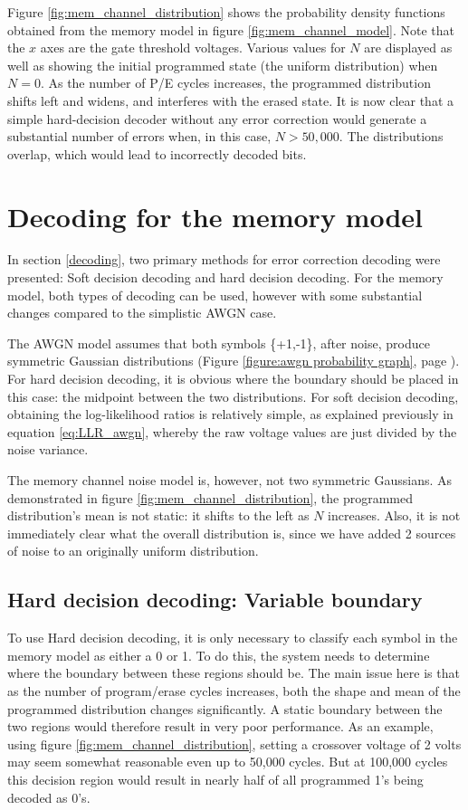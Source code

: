 \documentclass[11pt]{article}
\numberwithin{equation}{subsection}
\begin{document}
Figure \ref{fig:mem_channel_distribution} shows the probability density functions obtained from the memory model in figure \ref{fig:mem_channel_model}. Note that the $x$ axes are the gate threshold voltages. Various values for $N$ are displayed as well as showing the initial programmed state (the uniform distribution) when $N=0$. As the number of P/E cycles increases, the programmed distribution shifts left and widens, and interferes with the erased state. It is now clear that a simple hard-decision decoder without any error correction would generate a substantial number of errors when, in this case, $N > 50,000$. The distributions overlap, which would lead to incorrectly decoded bits.

\section{Decoding for the memory model} \label{section:memoryDecoding}

In section \ref{decoding}, two primary methods for error correction decoding were presented: Soft decision decoding and hard decision decoding. For the memory model, both types of decoding can be used, however with some substantial changes compared to the simplistic AWGN case.

The AWGN model assumes that both symbols \{+1,-1\}, after noise, produce symmetric Gaussian distributions (Figure \ref{figure:awgn probability graph}, page \pageref{figure:awgn probability graph}). For hard decision decoding, it is obvious where the boundary should be placed in this case: the midpoint between the two distributions. For soft decision decoding, obtaining the log-likelihood ratios is relatively simple, as explained previously in equation \ref{eq:LLR_awgn}, whereby the raw voltage values are just divided by the noise variance. 

The memory channel noise model is, however, not two symmetric Gaussians. As demonstrated in figure \ref{fig:mem_channel_distribution}, the programmed distribution's mean is not static: it shifts to the left as $N$ increases. Also, it is not immediately clear what the overall distribution is, since we have added 2 sources of noise to an originally uniform distribution.

\subsection{Hard decision decoding: Variable boundary}

To use Hard decision decoding, it is only necessary to classify each symbol in the memory model as either a 0 or 1. To do this, the system needs to determine where the boundary between these regions should be. The main issue here is that as the number of program/erase cycles increases, both the shape and mean of the programmed distribution changes significantly. A static boundary between the two regions would therefore result in very poor performance. As an example, using figure \ref{fig:mem_channel_distribution}, setting a crossover voltage of 2 volts may seem somewhat reasonable even up to 50,000 cycles. But at 100,000 cycles this decision region would result in nearly half of all programmed 1's being decoded as 0's.
\end{document}
